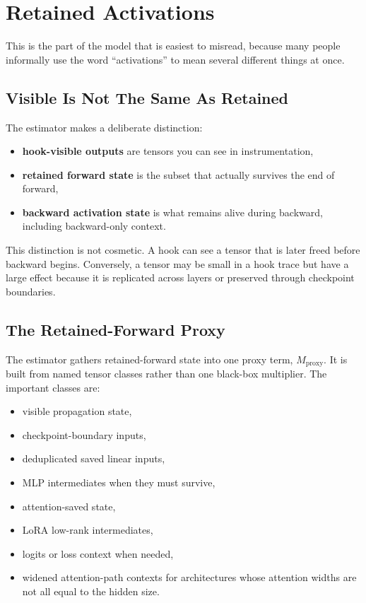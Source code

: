 \section{Retained Activations}
This is the part of the model that is easiest to misread, because many people
informally use the word ``activations'' to mean several different things at
once.

\subsection{Visible Is Not The Same As Retained}
The estimator makes a deliberate distinction:
\begin{itemize}[leftmargin=1.5em]
\item \textbf{hook-visible outputs} are tensors you can see in instrumentation,
\item \textbf{retained forward state} is the subset that actually survives the
end of forward,
\item \textbf{backward activation state} is what remains alive during backward,
including backward-only context.
\end{itemize}

This distinction is not cosmetic. A hook can see a tensor that is later freed
before backward begins. Conversely, a tensor may be small in a hook trace but
have a large effect because it is replicated across layers or preserved through
checkpoint boundaries.

\subsection{The Retained-Forward Proxy}
The estimator gathers retained-forward state into one proxy term,
$M_{\mathrm{proxy}}$. It is built from named tensor classes rather than one
black-box multiplier. The important classes are:
\begin{itemize}[leftmargin=1.5em]
\item visible propagation state,
\item checkpoint-boundary inputs,
\item deduplicated saved linear inputs,
\item MLP intermediates when they must survive,
\item attention-saved state,
\item LoRA low-rank intermediates,
\item logits or loss context when needed,
\item widened attention-path contexts for architectures whose attention widths
are not all equal to the hidden size.
\end{itemize}


